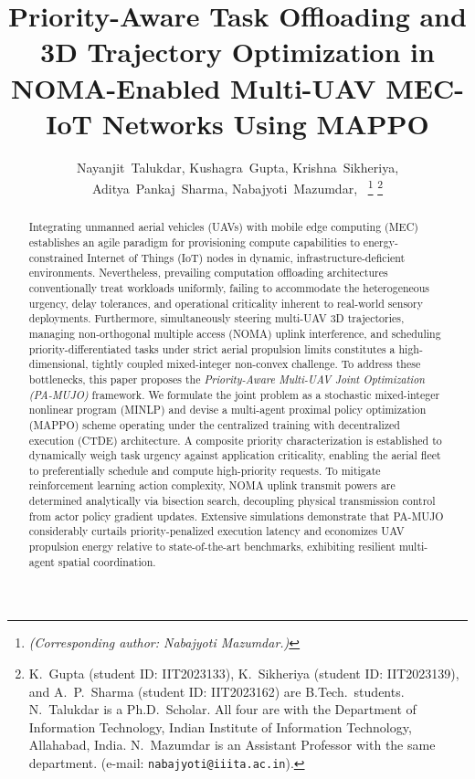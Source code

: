 \documentclass[journal]{IEEEtran}
\begin{document}
\raggedbottom

\title{Priority-Aware Task Offloading and 3D Trajectory Optimization in NOMA-Enabled Multi-UAV MEC-IoT Networks Using MAPPO}

\author{Nayanjit~Talukdar, Kushagra~Gupta, Krishna~Sikheriya, Aditya~Pankaj~Sharma,
    Nabajyoti~Mazumdar,~
    \thanks{\emph{(Corresponding author: Nabajyoti Mazumdar.)}}
    \thanks{K.~Gupta (student ID: IIT2023133), K.~Sikheriya (student ID: IIT2023139), and A.~P.~Sharma (student ID: IIT2023162) are B.Tech.\ students. N.~Talukdar is a Ph.D.\ Scholar. All four are with the Department of Information Technology, Indian Institute of Information Technology, Allahabad, India. N.~Mazumdar is an Assistant Professor with the same department. (e-mail: \texttt{nabajyoti@iiita.ac.in}).}
}

\maketitle

\begin{abstract}
Integrating unmanned aerial vehicles (UAVs) with mobile edge computing (MEC) establishes an agile paradigm for provisioning compute capabilities to energy-constrained Internet of Things (IoT) nodes in dynamic, infrastructure-deficient environments. Nevertheless, prevailing computation offloading architectures conventionally treat workloads uniformly, failing to accommodate the heterogeneous urgency, delay tolerances, and operational criticality inherent to real-world sensory deployments. Furthermore, simultaneously steering multi-UAV 3D trajectories, managing non-orthogonal multiple access (NOMA) uplink interference, and scheduling priority-differentiated tasks under strict aerial propulsion limits constitutes a high-dimensional, tightly coupled mixed-integer non-convex challenge. To address these bottlenecks, this paper proposes the \textit{Priority-Aware Multi-UAV Joint Optimization (PA-MUJO)} framework. We formulate the joint problem as a stochastic mixed-integer nonlinear program (MINLP) and devise a multi-agent proximal policy optimization (MAPPO) scheme operating under the centralized training with decentralized execution (CTDE) architecture. A composite priority characterization is established to dynamically weigh task urgency against application criticality, enabling the aerial fleet to preferentially schedule and compute high-priority requests. To mitigate reinforcement learning action complexity, NOMA uplink transmit powers are determined analytically via bisection search, decoupling physical transmission control from actor policy gradient updates. Extensive simulations demonstrate that PA-MUJO considerably curtails priority-penalized execution latency and economizes UAV propulsion energy relative to state-of-the-art benchmarks, exhibiting resilient multi-agent spatial coordination.
\end{abstract}
\end{document}
